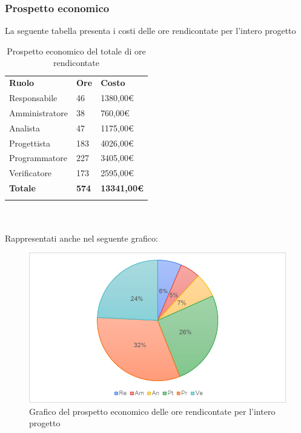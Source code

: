 \subsubsection{Prospetto economico}
La seguente tabella presenta i costi delle ore rendicontate per l'intero progetto\glo
\begin{longtable} {
		>{}p{32mm}
		>{}p{20mm}
		>{}p{20mm}
	}
	\rowcolor{gray!50}
	
	\textbf{Ruolo} & \textbf{Ore} & \textbf{Costo} \TBstrut \\
	Responsabile & 46 & 1380,00\euro{} \TBstrut \\
	Amministratore & 38 & 760,00\euro{} \TBstrut \\
	Analista & 47 & 1175,00\euro{} \TBstrut \\
	Progettista & 183 & 4026,00\euro{} \TBstrut \\
	Programmatore & 227 & 3405,00\euro{} \TBstrut \\
	Verificatore & 173 & 2595,00\euro{} \TBstrut \\
	\textbf{Totale} & \textbf{574}& \textbf{13341,00\euro{}} \TBstrut \\		
	\rowcolor{white}
	\caption{Prospetto economico del totale di ore rendicontate}
\end{longtable} \mbox{} \\ \\
Rappresentati anche nel seguente grafico:
\begin{figure} [H]
	\includegraphics[width=\linewidth]{./img/Grafici/12.png}
	\caption{Grafico del prospetto economico delle ore rendicontate per l'intero progetto\glo}
\end{figure}
	
